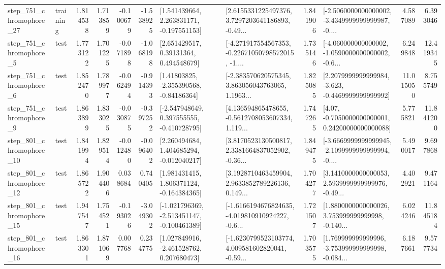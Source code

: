 \begin{tabular}{llrrrrllrlrr}
  step\_751\_chromophore\_27 &  training &      1.814538 &    1.713859 &     -0.100679 & -1.538925 &    [1.541439664, 2.263831171, -0.197551153] &  [2.6155331225497376, 3.7297203641186893, -0.49... &       1.841906 &  [-2.5060000000000002, -3.4349999999999987, -0.... &            4.587089 &          6.393046 \\
   step\_751\_chromophore\_5 &      test &      1.773122 &    1.701225 &     -0.071898 & -1.068198 &      [2.651429517, 0.39131364, 0.494548679] &  [-4.271917554567353, -0.22671050798572015, -1.... &       1.735146 &  [-4.060000000000002, -1.0590000000000002, -0.6... &            6.249848 &         12.419345 \\
   step\_751\_chromophore\_6 &      test &      1.852470 &    1.789977 &     -0.062494 & -0.914393 &     [1.41803825, -2.355390568, -0.84186364] &  [-2.383570620575345, 3.863056043763065, 1.1963... &       1.825085 &  [2.2079999999999984, -3.623, -0.4469999999999992] &           11.015050 &          8.755749 \\
   step\_751\_chromophore\_9 &      test &      1.863899 &    1.833025 &     -0.030875 & -0.397252 &   [-2.547948649, 0.397555555, -0.410728795] &  [4.136594865478655, -0.5612708053607334, 1.119... &       1.747265 &   [4.07, -0.7050000000000001, 0.24200000000000088] &            5.775821 &         11.841200 \\
  step\_801\_chromophore\_10 &      test &      1.841994 &    1.829514 &     -0.012480 & -0.096402 &    [2.260494684, 1.404685294, -0.012040217] &  [3.8170523130500817, 2.3381664837052902, -0.36... &       1.849475 &  [-3.6669999999999945, -2.1099999999999994, -0.... &            5.490017 &          9.697868 \\
  step\_801\_chromophore\_12 &      test &      1.865722 &    1.904406 &      0.038684 &  0.740405 &    [1.981431415, 1.806371124, -0.164384365] &  [3.1928710463459904, 2.9633852789226136, 0.149... &       1.704277 &  [3.1410000000000053, 2.5939999999999976, -0.49... &            4.402921 &          9.471164 \\
  step\_801\_chromophore\_15 &      test &      1.947547 &    1.754521 &     -0.193026 & -3.049302 &  [-1.021796369, -2.513451147, -0.100461389] &  [-1.6166194676824635, -4.019810910924227, -0.6... &       1.721507 &  [1.8800000000000026, 3.753999999999998, -0.140... &            6.024246 &         11.845184 \\
  step\_801\_chromophore\_16 &      test &      1.863301 &    1.871069 &      0.007768 &  0.234775 &    [1.027849916, -2.461528762, 0.207680473] &  [-1.6230799523103774, 4.009581602820041, -0.59... &       1.703575 &  [1.769999999999996, -3.753999999999998, -0.084... &            6.187661 &          9.577734 \\

\end{tabular}
